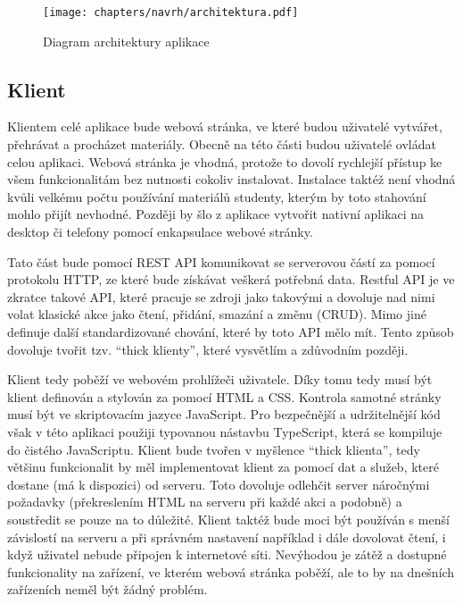 \begin{figure}[ht!]
    \centering
    \texttt{[image: chapters/navrh/architektura.pdf]}
    \caption{Diagram architektury aplikace}\label{fig:architektura}
\end{figure}

\subsection{Klient}\label{text:navrh/klient}

Klientem celé aplikace bude webová stránka, ve které budou uživatelé vytvářet, přehrávat a procházet materiály. 
Obecně na této části budou uživatelé ovládat celou aplikaci.
Webová stránka je vhodná, protože to dovolí rychlejší přístup ke všem funkcionalitám bez nutnosti cokoliv instalovat.
Instalace taktéž není vhodná kvůli velkému počtu používání materiálů studenty, kterým by toto stahování mohlo přijít nevhodné.
Později by šlo z aplikace vytvořit nativní aplikaci na desktop či telefony pomocí enkapsulace webové stránky.

Tato část bude pomocí REST API komunikovat se serverovou částí za pomocí protokolu HTTP, ze které bude získávat veškerá potřebná data.
Restful API je ve zkratce takové API, které pracuje se zdroji jako takovými a dovoluje nad nimi volat klasické akce jako čtení, přidání, smazání a změnu (CRUD).
Mimo jiné definuje další standardizované chování, které by toto API mělo mít.
Tento způsob dovoluje tvořit tzv. \enquote{thick klienty}, které vysvětlím a zdůvodním později.

Klient tedy poběží ve webovém prohlížeči uživatele.
Díky tomu tedy musí být klient definován a stylován za pomocí HTML a CSS.
Kontrola samotné stránky musí být ve skriptovacím jazyce JavaScript.
Pro bezpečnější a udržitelnější kód však v této aplikaci použiji typovanou nástavbu TypeScript, která se kompiluje do čistého JavaScriptu.
Klient bude tvořen v myšlence \enquote{thick klienta}, tedy většinu funkcionalit by měl implementovat klient za pomocí dat a služeb, které dostane (má k dispozici) od serveru.
Toto dovoluje odlehčit server náročnými požadavky (překreslením HTML na serveru při každé akci a podobně) a soustředit se pouze na to důležité.
Klient taktéž bude moci být používán s menší závislostí na serveru a při správném nastavení například i dále dovolovat čtení, i když uživatel nebude připojen k internetové síti.
Nevýhodou je zátěž a dostupné funkcionality na zařízení, ve kterém webová stránka poběží, ale to by na dnešních zařízeních neměl být žádný problém.

